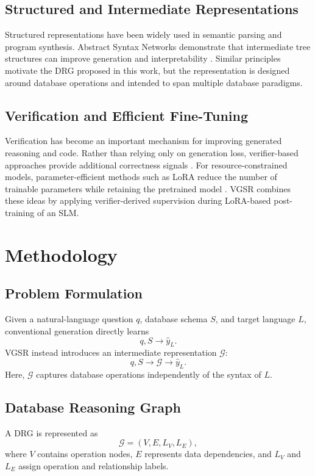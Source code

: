 \documentclass[conference]{IEEEtran}
\begin{document}
\subsection{Structured and Intermediate Representations}
Structured representations have been widely used in semantic parsing and program synthesis. Abstract Syntax Networks demonstrate that intermediate tree structures can improve generation and interpretability \cite{b11}. Similar principles motivate the DRG proposed in this work, but the representation is designed around database operations and intended to span multiple database paradigms.

\subsection{Verification and Efficient Fine-Tuning}
Verification has become an important mechanism for improving generated reasoning and code. Rather than relying only on generation loss, verifier-based approaches provide additional correctness signals \cite{b13}. For resource-constrained models, parameter-efficient methods such as LoRA reduce the number of trainable parameters while retaining the pretrained model \cite{c34}. VGSR combines these ideas by applying verifier-derived supervision during LoRA-based post-training of an SLM.

\section{Methodology}
\subsection{Problem Formulation}
Given a natural-language question $q$, database schema $S$, and target language $L$, conventional generation directly learns
\begin{equation}
q,S \rightarrow \hat{y}_L.
\end{equation}
VGSR instead introduces an intermediate representation $\mathcal{G}$:
\begin{equation}
q,S \rightarrow \mathcal{G} \rightarrow \hat{y}_L.
\end{equation}
Here, $\mathcal{G}$ captures database operations independently of the syntax of $L$.

\subsection{Database Reasoning Graph}
A DRG is represented as
\begin{equation}
\mathcal{G}=(V,E,L_V,L_E),
\end{equation}
where $V$ contains operation nodes, $E$ represents data dependencies, and $L_V$ and $L_E$ assign operation and relationship labels.
\end{document}
